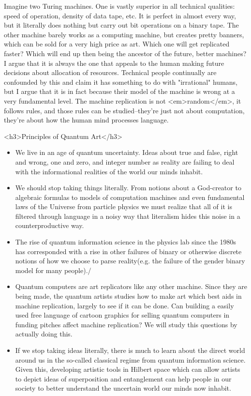 \documentclass[11pt]{article}
\begin{document}
    Imagine two Turing machines.  One is vastly superior in all technical qualities: speed of operation, density of data tape, etc.  It is perfect in almost every way, but it literally does nothing but carry out bit operations on a binary tape.  The other machine barely works as a computing machine, but creates pretty banners, which can be sold for a very high price as art. Which one will get replicated faster?  Which will end up then being the ancestor of the future, better machines?  I argue that it is always the one that appeals to the human making future decisions about allocation of resources.  Technical people continually are confounded by this and claim it has something to do with "irrational" humans, but I argue that it is in fact because their model of the machine is wrong at a very fundamental level.  The machine replication is not <em>random</em>, it follows rules, and those rules can be studied--they're just not about computation, they're about how the human mind processes language.  


<h3>Principles of Quantum Art</h3>
\begin{itemize}

    \item
We live in an age of quantum uncertainty.  Ideas about true and false, right and wrong, one and zero, and integer number as reality are failing to deal with the informational realities of the world our minds inhabit. 
    
    \item
We should stop taking things literally.  From notions about a God-creator to algebraic formulas to models of computation machines and even fundamental laws of the Universe from particle physics we must realize that all of it is filtered through language in a noisy way that literalism hides this noise in a counterproductive way.
    \item
The rise of quantum information science in the physics lab since the 1980s has corresponded with a rise in other failures of binary or otherwise discrete notions of how we choose to parse reality(e.g. the failure of the gender binary model for many people)./
    \item

        Quantum computers are art replicators like any other machine.  Since they are being made, the quantum artists studies how to make art which best aids in machine replication, largely to see if it can be done.  Can building a easily used free language of cartoon graphics for selling quantum computers in funding pitches affect machine replication?  We will study this questions by actually doing this.
    
    \item

        If we stop taking ideas literally, there is much to learn about the direct world around us in the so-called classical regime from quantum information science.  Given this, developing artistic tools in Hilbert space which can allow artists to depict ideas of superposition and entanglement can help people in our society to better understand the uncertain world our minds now inhabit.  
    
\end{itemize}
\end{document}
